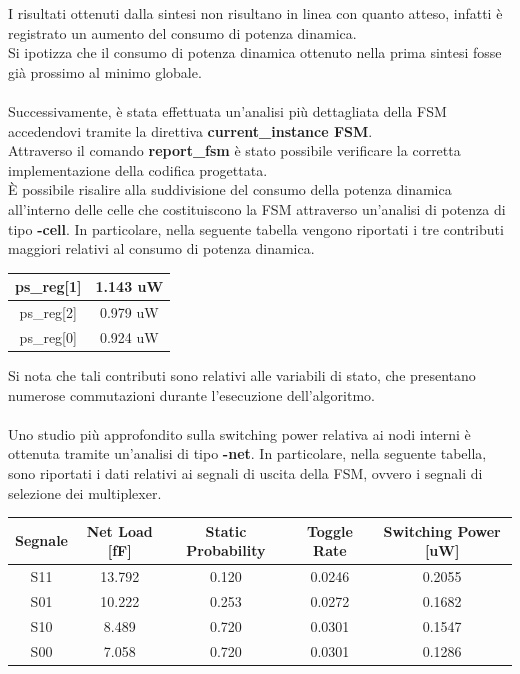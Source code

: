 \documentclass[11pt,  english, makeidx, a4paper, titlepage, oneside]{book}
\begin{document}
I risultati ottenuti dalla sintesi non risultano in linea con quanto atteso, infatti è registrato un aumento del consumo di potenza dinamica.
\\
Si ipotizza che il consumo di potenza dinamica ottenuto nella prima sintesi fosse già prossimo al minimo globale.
\\\\
Successivamente, è stata effettuata un'analisi più dettagliata della FSM accedendovi tramite la direttiva\textbf{ current\_instance FSM}.\\
Attraverso il comando \textbf{report\_fsm} è stato possibile verificare la corretta implementazione della codifica progettata.
\\
È possibile risalire alla suddivisione del consumo della potenza dinamica all'interno delle celle che costituiscono la FSM attraverso un'analisi di potenza di tipo \textbf{-cell}. In particolare, nella seguente tabella vengono riportati i tre contributi maggiori relativi al consumo di potenza dinamica.
\\
\begin{center}
	\begin{tabular}{|c|c|}
	\hline
	  ps\_reg[1] & 1.143 uW  \\
	\hline
	 ps\_reg[2] & 0.979 uW\\
	\hline
	ps\_reg[0] & 0.924 uW\\
	\hline
	\end{tabular}	
\end{center}
\vspace{0.3cm}
Si nota che tali contributi sono relativi alle variabili di stato, che presentano numerose commutazioni durante l'esecuzione dell'algoritmo.
\\\\
Uno studio più approfondito sulla switching power relativa ai nodi interni è ottenuta tramite un'analisi di tipo \textbf{-net}. In particolare, nella seguente tabella, sono riportati i dati relativi ai segnali di uscita della FSM, ovvero i segnali di selezione dei multiplexer.
\\
\begin{center}
	\begin{tabular}{|c|c|c|c|c|}
	\hline
	Segnale & Net Load [fF] & Static Probability & Toggle Rate & Switching Power [uW] \\
	\hline
	 S11 & 13.792  &  0.120  &  0.0246  & 0.2055 \\
	\hline
	 S01 & 10.222  &  0.253  &  0.0272  & 0.1682 \\
	\hline
	S10 & 8.489  &  0.720  &  0.0301  & 0.1547\\
	\hline
	S00 & 7.058  &  0.720  &  0.0301  & 0.1286 \\
	\hline
	\end{tabular}	
\end{center}
\end{document}
